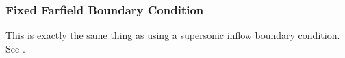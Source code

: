 \subsubsection{Fixed Farfield Boundary Condition}\label{SEC:BC:Farfield:Fixed}

This is exactly the same thing as using a supersonic inflow boundary condition.
%
See .


